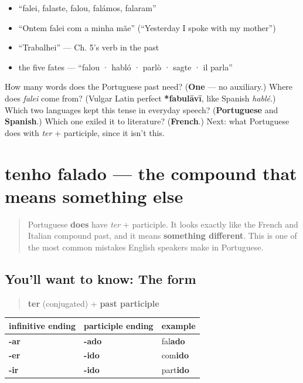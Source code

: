 \begin{itemize}
\raggedright
  \item \textquotedblleft{}falei, falaste, falou, falámos, falaram\textquotedblright{}
  \item \textquotedblleft{}Ontem falei com a minha mãe\textquotedblright{} (\textquotedblleft{}Yesterday I spoke with my mother\textquotedblright{})
  \item \textquotedblleft{}Trabalhei\textquotedblright{} — Ch. 5's verb in the past
  \item the five fates — \textquotedblleft{}falou · habló · parlò · sagte · il parla\textquotedblright{}
\end{itemize}

\begin{tcolorbox}[breakable,colback=teal!4,colframe=teal!35!black,title={Before you move on}]
How many words does the Portuguese past need? (\textbf{One} — no auxiliary.) Where does \emph{falei} come from? (Vulgar Latin perfect \textbf{*fabulāvī}, like Spanish \emph{hablé}.) Which two languages kept this tense in everyday speech? (\textbf{Portuguese} and \textbf{Spanish}.) Which one exiled it to literature? (\textbf{French}.) Next: what Portuguese does with \emph{ter} + participle, since it isn't this.
\end{tcolorbox}
\section[tenho falado]{tenho falado — the compound that means something else}

\label{lesson:PT-C15-tenho-falado}



\begin{quote}
Portuguese \textbf{does} have \emph{ter} + participle. It looks exactly like the French and Italian compound past, and it means \textbf{something different}. This is one of the most common mistakes English speakers make in Portuguese.
\end{quote}

\subsection*{You'll want to know: The form}
\begin{quote}
\textbf{ter} (conjugated) + \textbf{past participle}
\end{quote}

\noindent
\begin{tabularx}{\linewidth}{@{}>{\raggedright\arraybackslash}X>{\raggedright\arraybackslash}X>{\raggedright\arraybackslash}X@{}}
\toprule
\textbf{infinitive ending} & \textbf{participle ending} & \textbf{example} \\
\midrule
\textbf{-ar} & \textbf{-ado} & fal\textbf{ado} \\
\textbf{-er} & \textbf{-ido} & com\textbf{ido} \\
\textbf{-ir} & \textbf{-ido} & part\textbf{ido} \\
\bottomrule
\end{tabularx}

